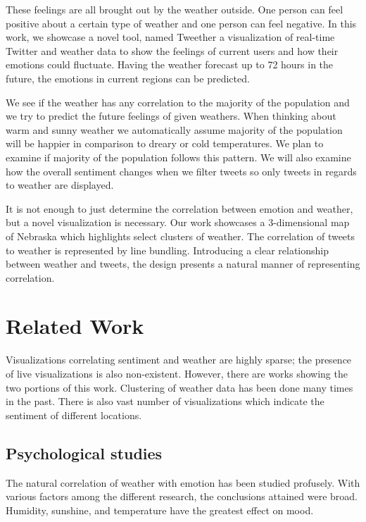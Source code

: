 \documentclass[journal]{vgtc}                %
\begin{document}
These feelings are all brought out by the weather outside. One person can feel positive about a certain type of weather and one person can feel negative. In this work, we showcase a novel tool, named Tweether a visualization of real-time Twitter and weather data to show the feelings of current users and how their emotions could fluctuate. Having the weather forecast up to 72 hours in the future, the emotions in current regions can be predicted. 

We see if the weather has any correlation to the majority of the population and we try to predict the future feelings of given weathers.  When thinking about warm and sunny weather we automatically assume majority of the population will be happier in comparison to dreary or cold temperatures. We plan to examine if majority of the population follows this pattern. We will also examine how the overall sentiment changes when we filter tweets so only tweets in regards to weather are displayed.

It is not enough to just determine the correlation between emotion and weather, but a novel visualization is necessary. Our work showcases a 3-dimensional map of Nebraska which highlights select clusters of weather. The correlation of tweets to weather is represented by line bundling. Introducing a clear relationship between weather and tweets, the design presents a natural manner of representing correlation.


\section{Related Work}

Visualizations correlating sentiment and weather are highly sparse; the presence of live visualizations is also non-existent. However, there are works showing the two portions of this work. Clustering of weather data has been done many times in the past. There is also vast number of visualizations which indicate the sentiment of different locations.

\subsection{Psychological studies}

The natural correlation of weather with emotion has been studied profusely. \cite{bollen2011twitter,denissen2008effects,hannak2012tweetin,howarth1984multidimensional,lambert2002effect}  With various factors among the different research, the conclusions attained were broad. Humidity, sunshine, and temperature have the greatest effect on mood. \cite{bollen2011twitter} 
\end{document}

